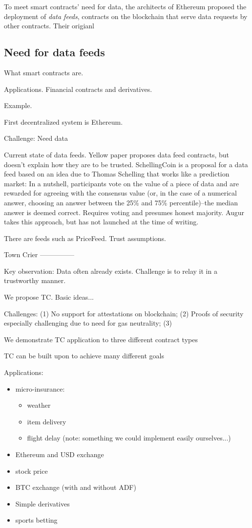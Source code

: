 To meet smart contracts' need for data, the architects of Ethereum proposed the deployment of \emph{data feeds}, contracts on the blockchain that serve data requests by other contracts. Their origianl 

\subsection{Need for data feeds}



What smart contracts are.

Applications. Financial contracts and derivatives.

Example.

First decentralized system is Ethereum.

Challenge: Need data


Current state of data feeds. Yellow paper proposes data feed contracts, but doesn't explain how they are to be trusted. SchellingCoin is a proposal for a data feed based on an idea due to Thomas Schelling that works like a prediction market: In a nutshell, participants vote on the value of a piece of data and are rewarded for agreeing with the consensus value (or, in the case of a numerical answer, choosing an answer between the 25\% and 75\% percentile)--the median answer is deemed correct. Requires voting and presumes honest majority. Augur takes this approach, but has not launched at the time of writing.

There are feeds such as PriceFeed. Trust assumptions.

Town Crier
---------------

Key observation: Data often already exists. Challenge is to relay it in a trustworthy manner.

We propose TC. Basic ideas...

Challenges: (1) No support for attestations on blockchain; (2) Proofs of security especially challenging due to need for gas neutrality; (3) 

We demonstrate TC application to three different contract types

TC can be built upon to achieve many different goals 




Applications:
\begin{itemize}
\item micro-insurance:
    \begin{itemize}
    \item weather
    \item item delivery
    \item flight delay (note: something we could implement easily ourselves...)
    \end{itemize}
\item Ethereum and USD exchange
\item stock price
\item BTC exchange (with and without ADF)
\item Simple derivatives
\item sports betting
\end{itemize}

